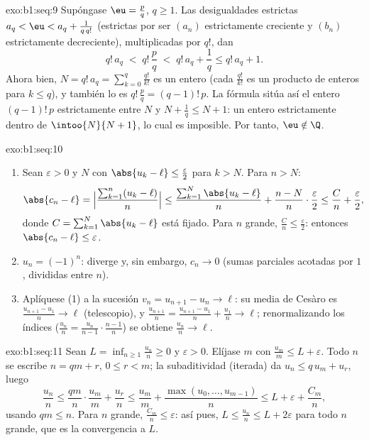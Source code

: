 \begin{solution}{exo:b1:seq:9}
Supóngase $\eu = \frac pq$, $q \geq 1$. Las desigualdades estrictas
$a_q < \eu < a_q + \frac{1}{q\,q!}$ (estrictas por ser $(a_n)$
estrictamente creciente y $(b_n)$ estrictamente decreciente),
multiplicadas por $q!$, dan
\[
q!\,a_q \;<\; q!\,\frac pq \;<\; q!\,a_q + \frac 1q \leq q!\,a_q + 1.
\]
Ahora bien, $N = q!\,a_q = \sum_{k=0}^{q} \frac{q!}{k!}$ es un entero
(cada $\frac{q!}{k!}$ es un producto de enteros para $k \leq q$), y
también lo es $q!\,\frac pq = (q-1)!\,p$. La fórmula sitúa así el
entero $(q-1)!\,p$ estrictamente entre $N$ y $N + \frac 1q \leq N + 1$:
un entero estrictamente dentro de $\intoo{N}{N+1}$, lo cual es
imposible. Por tanto, $\eu \notin \Q$.
\end{solution}

\begin{solution}{exo:b1:seq:10}
\begin{enumerate}
  \item Sean $\varepsilon > 0$ y $N$ con $\abs{u_k - \ell} \leq
        \frac{\varepsilon}{2}$ para $k > N$. Para $n > N$:
        \[
        \abs{c_n - \ell}
        = \Bigl|\frac{\sum_{k=1}^{n}(u_k - \ell)}{n}\Bigr|
        \leq \frac{\sum_{k=1}^{N} \abs{u_k - \ell}}{n}
        + \frac{n - N}{n}\cdot\frac{\varepsilon}{2}
        \leq \frac{C}{n} + \frac{\varepsilon}{2},
        \]
        donde $C = \sum_{k=1}^N \abs{u_k - \ell}$ está fijado. Para
        $n$ grande, $\frac Cn \leq \frac\varepsilon2$: entonces
        $\abs{c_n - \ell} \leq \varepsilon$.
  \item $u_n = (-1)^n$: diverge y, sin embargo, $c_n \to 0$ (sumas
        parciales acotadas por $1$, divididas entre $n$).
  \item Aplíquese (1) a la sucesión $v_n = u_{n+1} - u_n \to \ell$: su
        media de Cesàro es $\frac{u_{n+1} - u_1}{n} \to \ell$
        (telescopio), y $\frac{u_{n+1}}{n} = \frac{u_{n+1} - u_1}{n} +
        \frac{u_1}{n} \to \ell$; renormalizando los índices
        ($\frac{u_n}{n} = \frac{u_n}{n-1}\cdot\frac{n-1}{n}$) se
        obtiene $\frac{u_n}{n} \to \ell$.
\end{enumerate}
\end{solution}

\begin{solution}{exo:b1:seq:11}
Sean $L = \inf_{n \geq 1} \frac{u_n}{n} \geq 0$ y $\varepsilon > 0$.
Elíjase $m$ con $\frac{u_m}{m} \leq L + \varepsilon$. Todo $n$ se
escribe $n = qm + r$, $0 \leq r < m$; la subaditividad (iterada) da
$u_n \leq q\,u_m + u_r$, luego
\[
\frac{u_n}{n} \leq \frac{q m}{n}\cdot\frac{u_m}{m} + \frac{u_r}{n}
\leq \frac{u_m}{m} + \frac{\max(u_0, \dots, u_{m-1})}{n}
\leq L + \varepsilon + \frac{C_m}{n},
\]
usando $qm \leq n$. Para $n$ grande,
$\frac{C_m}{n} \leq \varepsilon$: así pues,
$L \leq \frac{u_n}{n} \leq L + 2\varepsilon$ para todo $n$ grande, que
es la convergencia a $L$.
\end{solution}

